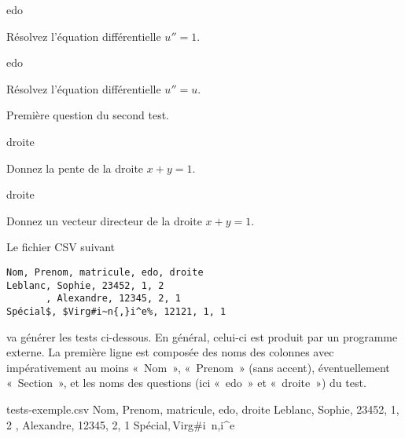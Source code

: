 \documentclass[12pt,a4paper, rulers]{tests}
\begin{document}
\vspace{3ex}

\begin{namequestion}{edo}%
  \begin{question}
    Résolvez l'équation différentielle $u'' = 1$.
  \end{question}
\end{namequestion}
\begin{namequestion}{edo}%
  \begin{question}
    Résolvez l'équation différentielle $u'' = u$.
  \end{question}
\end{namequestion}


\exam
{}
\maketitle %

\begin{question}
  Première question du second test.
\end{question}


\begin{namequestion}{droite}
  \begin{question}
    Donnez la pente de la droite $x + y = 1$.    
  \end{question}
\end{namequestion}
\begin{namequestion}{droite}
  \begin{question}
    Donnez un vecteur directeur de la droite $x + y = 1$.    
  \end{question}
\end{namequestion}

\vspace{10ex}
Le fichier CSV suivant
\begin{verbatim}
Nom, Prenom, matricule, edo, droite
Leblanc, Sophie, 23452, 1, 2
       , Alexandre, 12345, 2, 1
Spécial$, $Virg#i~n{,}i^e%, 12121, 1, 1
\end{verbatim}
va générer les tests ci-dessous.  En général, celui-ci est produit
par un programme externe.  La première ligne est composée des noms des
colonnes avec impérativement au moins «~Nom~», «~Prenom~» (sans
accent), éventuellement «~Section~», et les noms des questions (ici
«~edo~» et «~droite~») du test.

\begin{filecontents*}{tests-exemple.csv}
Nom, Prenom, matricule, edo, droite
Leblanc, Sophie, 23452, 1, 2
       , Alexandre, 12345, 2, 1
Spécial$, $Virg#i~n{,}i^e%
\end{filecontents*}

\end{document}
